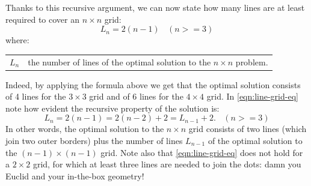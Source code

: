 \documentclass[11pt]{article}
\makeatletter
\newenvironment{conditions}
  {\par\vspace{\abovedisplayskip}\noindent\begin{tabular}{>{$}l<{$} @{${}={}$} l}}
  {\end{tabular}\par\vspace{\belowdisplayskip}}
\makeatother
\begin{document}
Thanks to this recursive argument, we can now state how many lines are at least required to cover an $n \times n$ grid:
\begin{equation}
L_n = 2(n - 1)\ \ \ \  (n >=3)
\label{eqn:line-grid-eq}
\end{equation}
where:
\begin{conditions}
	L_n  &  the number of lines of the optimal solution to the $n\times n$ problem.
\end{conditions}
Indeed, by applying the formula above we get that the optimal solution consists of 4 lines for the $3 \times 3$ grid and of 6 lines for the $4 \times 4$ grid. In \autoref{eqn:line-grid-eq} note how evident the recursive property of the solution is:
\begin{equation}
L_{n} = 2(n-1) = 2(n-2) + 2 = L_{n-1} + 2.\ \ \ \  (n >=3)
\label{eqn:line-grid-eq-recursion}
\end{equation}
In other words, the optimal solution to the $n\times n$ grid consists of two lines (which join two outer borders) plus the number of lines $L_{n-1}$ of the optimal solution to the $(n-1)\times (n-1)$ grid.
Note also that \autoref{eqn:line-grid-eq} does not hold for a $2\times 2$ grid, for which at least three lines are needed to join the dots: damn you Euclid and your in-the-box geometry!
\end{document}

